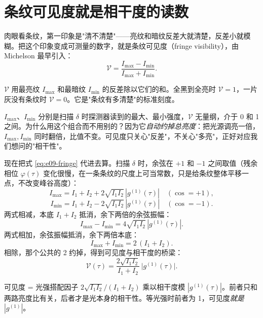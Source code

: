 \section{条纹可见度就是相干度的读数}
\label{sec:e09-visibility}

肉眼看条纹，第一印象是"清不清楚"——亮纹和暗纹反差大就清楚，反差小就模糊。把这个印象变成可测量的数字，就是条纹可见度（fringe visibility），由 Michelson 最早引入：
\begin{equation}
  \mathcal V=\frac{I_{\max}-I_{\min}}{I_{\max}+I_{\min}} .
  \label{eq:e09-visibility-def}
\end{equation}
\begin{formulaexplain}
\(\mathcal V\) 用最亮纹 \(I_{\max}\) 和最暗纹 \(I_{\min}\) 的反差除以它们的和。全黑到全亮时 \(\mathcal V=1\)，一片灰没有条纹时 \(\mathcal V=0\)。它是"条纹有多清楚"的标准刻度。
\end{formulaexplain}
\(I_{\max}\)、\(I_{\min}\) 分别是扫描 \(\delta\) 时探测器读到的最大、最小强度，\(\mathcal V\) 无量纲，介于 0 和 1 之间。为什么用这个组合而不用别的？因为它\emph{自动约掉总亮度}：把光源调亮一倍，\(I_{\max},I_{\min}\) 同时翻倍，比值不变。可见度只关心"反差"，不关心"多亮"，正好对应我们想问的"相干性"。

现在把式 \eqref{eq:e09-fringe} 代进去算。扫描 \(\delta\) 时，余弦在 \(+1\) 和 \(-1\) 之间取值（残余相位 \(\varphi(\tau)\) 变化很慢，在一条条纹的尺度上可当常数，只是给条纹整体平移一点，不改变峰谷高度）：
\[
  I_{\max}=I_1+I_2+2\sqrt{I_1 I_2}\,|g^{(1)}(\tau)|
  \quad(\cos=+1),
\]
\[
  I_{\min}=I_1+I_2-2\sqrt{I_1 I_2}\,|g^{(1)}(\tau)|
  \quad(\cos=-1).
\]
两式相减，本底 \(I_1+I_2\) 抵消，余下两倍的余弦振幅：
\[
  I_{\max}-I_{\min}=4\sqrt{I_1 I_2}\,|g^{(1)}(\tau)| .
\]
两式相加，余弦振幅抵消，余下两倍本底：
\[
  I_{\max}+I_{\min}=2\,(I_1+I_2).
\]
相除，那个公共的 2 约掉，得到可见度与相干度的桥梁：
\begin{equation}
  \mathcal V(\tau)=\frac{2\sqrt{I_1 I_2}}{I_1+I_2}\,\big|g^{(1)}(\tau)\big| .
  \label{eq:e09-visibility-g1}
\end{equation}
\begin{formulaexplain}
可见度 = 光强搭配因子 \(2\sqrt{I_1I_2}/(I_1+I_2)\) 乘以相干度模 \(|g^{(1)}(\tau)|\)。前者只和两路亮度比有关，后者才是光本身的相干性。等光强时前者为 1，可见度\emph{就是} \(|g^{(1)}|\)。
\end{formulaexplain}

